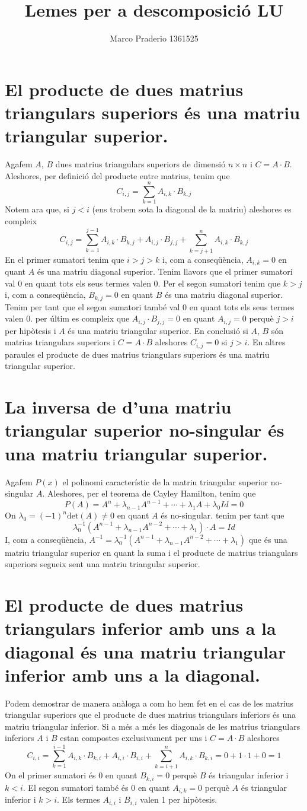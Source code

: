 \documentclass[a4paper,10pt]{article}
\title{Lemes per a descomposició LU}
\author{Marco Praderio 1361525}
\date{}
\renewcommand{\*}{\cdot}
\begin{document}
\maketitle
\section{El producte de dues matrius triangulars superiors és una matriu triangular superior.}
Agafem $A$, $B$ dues matrius triangulars superiors de dimensió $n\times n$ i $C=A\*B$. Aleshores, per definició del producte entre matrius, tenim que
$$C_{i,j}=\sum_{k=1}^nA_{i,k}\*B_{k,j}$$
Notem ara que, si $j<i$ (ens trobem sota la diagonal de la matriu) aleshores es compleix
$$C_{i,j}=\sum_{k=1}^{j-1}A_{i,k}\*B_{k,j}+A_{i,j}\*B_{j,j}+\sum_{k=j+1}^nA_{i,k}\*B_{k,j}$$
En el primer sumatori tenim que $i>j>k$ i, com a conseqüència, $A_{i,k}=0$ en quant $A$ és una matriu diagonal superior. Tenim llavors que el primer sumatori val 0 en quant
tots els seus termes valen 0. Per el segon sumatori tenim que $k>j$ i, com a conseqüència, $B_{k,j}=0$ en quant $B$ és una matriu diagonal superior. Tenim per tant que 
el segon sumatori també val 0 en quant tots els seus termes valen 0. per últim es compleix que $A_{i,j}\*B_{j,j}=0$ en quant $A_{i,j}=0$ perquè $j>i$ per hipòtesis i $A$ és
una matriu triangular superior. En conclusió si $A$, $B$ són matrius triangulars superiors i $C=A\*B$ aleshores $C_{i,j}=0$ si $j>i$. En altres paraules el producte de dues
matrius triangulars superiors és una matriu triangular superior.
\section{La inversa de d'una matriu triangular superior no-singular és una matriu triangular superior.}
Agafem $P(x)$ el polinomi característic de la matriu triangular superior no-singular $A$. Aleshores, per el teorema de Cayley Hamilton, tenim que
$$P(A)=A^n+\lambda_{n-1}A^{n-1}+\cdots+\lambda_{1}A+\lambda_0Id=0$$
On $\lambda_0=(-1)^n\text{det}(A)\not=0$ en quant $A$ és no-singular. tenim per tant que
$$\lambda_0^{-1}(A^{n-1}+\lambda_{n-1}A^{n-2}+\cdots+\lambda_{1})\*A=Id$$
I, com a conseqüència, $A^{-1}=\lambda_0^{-1}(A^{n-1}+\lambda_{n-1}A^{n-2}+\cdots+\lambda_{1})$ que és una matriu triangular superior en quant la suma i el producte de
matrius triangulars superiors segueix sent una matriu triangular superior.
\section{El producte de dues matrius triangulars inferior amb uns a la diagonal és una matriu triangular inferior amb uns a la diagonal.}
Podem demostrar de manera anàloga a com ho hem fet en el cas de les matrius triangular superiors que el producte de dues matrius triangulars inferiors és una matriu
triangular inferior. Si a més a més les diagonals de les matrius triangulars inferiors $A$ i $B$ estan compostes exclusivament per uns i $C=A\*B$ aleshores
$$C_{i,i}=\sum_{k=1}^{i-1}A_{i,k}\*B_{k,i}+A_{i,i}\*B_{i,i}+\sum_{k=i+1}^nA_{i,k}\*B_{k,i}=0+1\*1+0=1$$
On el primer sumatori és 0 en quant $B_{k,i}=0$ perquè $B$ és triangular inferior i $k<i$. El segon sumatori també és 0 en quant $A_{i,k}=0$ perquè $A$ és triangular
inferior i  $k>i$. Els termes $A_{i,i}$ i $B_{i,i}$ valen 1 per hipòtesis.
\end{document}
